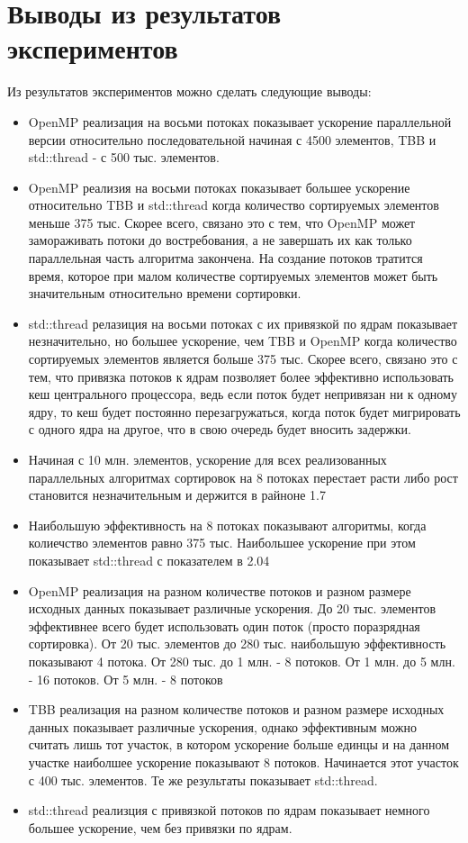 \documentclass{report}
\begin{document}
\section*{Выводы из результатов экспериментов}
\par Из результатов экспериментов можно сделать следующие выводы:
\begin{itemize}
    \item OpenMP реализация на восьми потоках показывает ускорение параллельной версии относительно последовательной начиная с 4500 элементов, TBB и std::thread - с 500 тыс. элементов. 
    \item OpenMP реализия на восьми потоках показывает большее ускорение относительно TBB и std::thread когда количество сортируемых элементов меньше 375 тыс. Скорее всего, связано это с тем, что OpenMP может замораживать потоки до востребования, а не завершать их как только параллельная часть алгоритма закончена. На создание потоков тратится время, которое при малом количестве сортируемых элементов может быть значительным относительно времени сортировки.
    \item std::thread релазиция на восьми потоках с их привязкой по ядрам показывает незначительно, но большее ускорение, чем TBB и OpenMP когда количество сортируемых элементов является больше 375 тыс. Скорее всего, связано это с тем, что привязка потоков к ядрам позволяет более эффективно использовать кеш центрального процессора, ведь если поток будет непривязан ни к одному ядру, то кеш будет постоянно перезагружаться, когда поток будет мигрировать с одного ядра на другое, что в свою очередь будет вносить задержки.
    \item Начиная с 10 млн. элементов, ускорение для всех реализованных параллельных алгоритмах сортировок на 8 потоках перестает расти либо рост становится незначительным и держится в райноне 1.7
    \item Наибольшую эффективность на 8 потоках показывают алгоритмы, когда колиечство элементов равно 375 тыс. Наибольшее ускорение при этом показывает std::thread с показателем в 2.04
    \item OpenMP реализация на разном количестве потоков и разном размере исходных данных показывает различные ускорения. До 20 тыс. элементов эффективнее всего будет использовать один поток (просто поразрядная сортировка). От 20 тыс. элементов до 280 тыс. наибольшую эффективность показывают 4 потока. От 280 тыс. до 1 млн. - 8 потоков. От 1 млн. до 5 млн. - 16 потоков. От 5 млн. - 8 потоков
    \item TBB реализация на разном количестве потоков и разном размере исходных данных показывает различные ускорения, однако эффективным можно считать лишь тот участок, в котором ускорение больше единцы и на данном участке наиболшее ускорение показывают 8 потоков. Начинается этот участок с 400 тыс. элементов. Те же результаты показывает std::thread.
    \item std::thread реализция с привязкой потоков по ядрам показывает немного большее ускорение, чем без привязки по ядрам.
\end{itemize}
\end{document}
